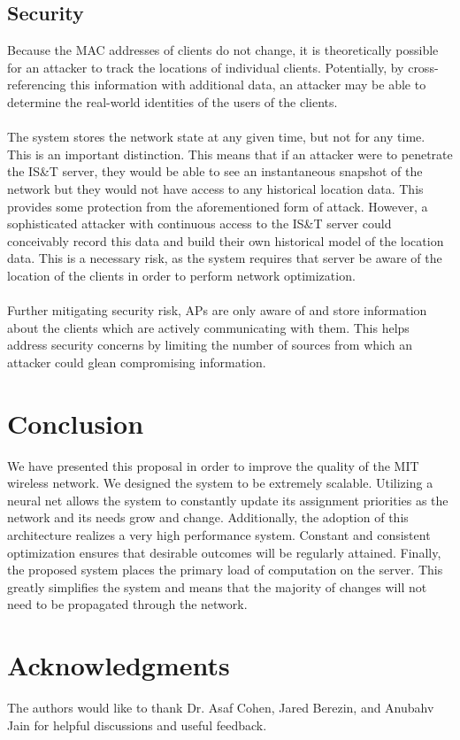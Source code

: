 \documentclass[10pt,journal,compsoc]{IEEEtran}
\begin{document}
		\subsection{Security}
		Because the MAC addresses of clients do not change, it is theoretically possible for an attacker to track the locations of individual clients. Potentially, by cross-referencing this information with additional data, an attacker may be able to determine the real-world identities of the users of the clients.\\
		\\
		The system stores the network state at any given time, but not for any time. This is an important distinction. This means that if an attacker were to penetrate the IS\&T server, they would be able to see an instantaneous snapshot of the network but they would not have access to any historical location data. This provides some protection from the aforementioned form of attack. However, a sophisticated attacker with continuous access to the IS\&T server could conceivably record this data and build their own historical model of the location data. This is a necessary risk, as the system requires that server be aware of the location of the clients in order to perform network optimization.\\
		\\
		Further mitigating security risk, APs are only aware of and store information about the clients which are actively communicating with them. This helps address security concerns by limiting the number of sources from which an attacker could glean compromising information.
		
		\section{Conclusion}
		We have presented this proposal in order to improve the quality of the MIT wireless network. We designed the system to be extremely scalable.  Utilizing a neural net allows the system to constantly update its assignment priorities as the network and its needs grow and change. Additionally, the adoption of this architecture realizes a very high performance system. Constant and consistent optimization ensures that desirable outcomes will be regularly attained. Finally, the proposed system places the primary load of computation on the server. This greatly simplifies the system and means that the majority of changes will not need to be propagated through the network.
		
		\section{Acknowledgments}
		The authors would like to thank Dr. Asaf Cohen, Jared Berezin, and Anubahv Jain for helpful discussions and useful feedback.
		
\end{document}
